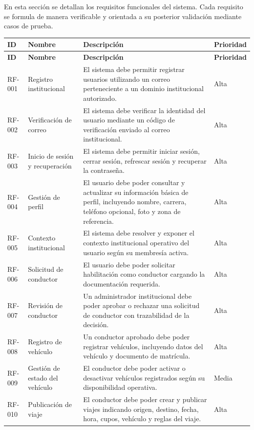 \documentclass[12pt]{article}
\begin{document}
En esta secci\'on se detallan los requisitos funcionales del sistema. Cada requisito se formula de manera verificable y orientada a su posterior validaci\'on mediante casos de prueba.

\begin{longtable}{|P{1.8cm}|P{3.8cm}|P{7.2cm}|P{2.2cm}|}
\hline
{}
\textbf{ID} & \textbf{Nombre} & \textbf{Descripci\'on} & \textbf{Prioridad} \\
\hline
\endfirsthead
\hline
{}
\textbf{ID} & \textbf{Nombre} & \textbf{Descripci\'on} & \textbf{Prioridad} \\
\hline
\endhead
RF-001 & Registro institucional & El sistema debe permitir registrar usuarios utilizando un correo perteneciente a un dominio institucional autorizado. & Alta \\
\hline
RF-002 & Verificaci\'on de correo & El sistema debe verificar la identidad del usuario mediante un c\'odigo de verificaci\'on enviado al correo institucional. & Alta \\
\hline
RF-003 & Inicio de sesi\'on y recuperaci\'on & El sistema debe permitir iniciar sesi\'on, cerrar sesi\'on, refrescar sesi\'on y recuperar la contrase\~na. & Alta \\
\hline
RF-004 & Gesti\'on de perfil & El usuario debe poder consultar y actualizar su informaci\'on b\'asica de perfil, incluyendo nombre, carrera, tel\'efono opcional, foto y zona de referencia. & Alta \\
\hline
RF-005 & Contexto institucional & El sistema debe resolver y exponer el contexto institucional operativo del usuario seg\'un su membres\'ia activa. & Alta \\
\hline
RF-006 & Solicitud de conductor & El usuario debe poder solicitar habilitaci\'on como conductor cargando la documentaci\'on requerida. & Alta \\
\hline
RF-007 & Revisi\'on de conductor & Un administrador institucional debe poder aprobar o rechazar una solicitud de conductor con trazabilidad de la decisi\'on. & Alta \\
\hline
RF-008 & Registro de veh\'iculo & Un conductor aprobado debe poder registrar veh\'iculos, incluyendo datos del veh\'iculo y documento de matr\'icula. & Alta \\
\hline
RF-009 & Gesti\'on de estado del veh\'iculo & El conductor debe poder activar o desactivar veh\'iculos registrados seg\'un su disponibilidad operativa. & Media \\
\hline
RF-010 & Publicaci\'on de viaje & El conductor debe poder crear y publicar viajes indicando origen, destino, fecha, hora, cupos, veh\'iculo y reglas del viaje. & Alta \\

\end{longtable}
\end{document}
